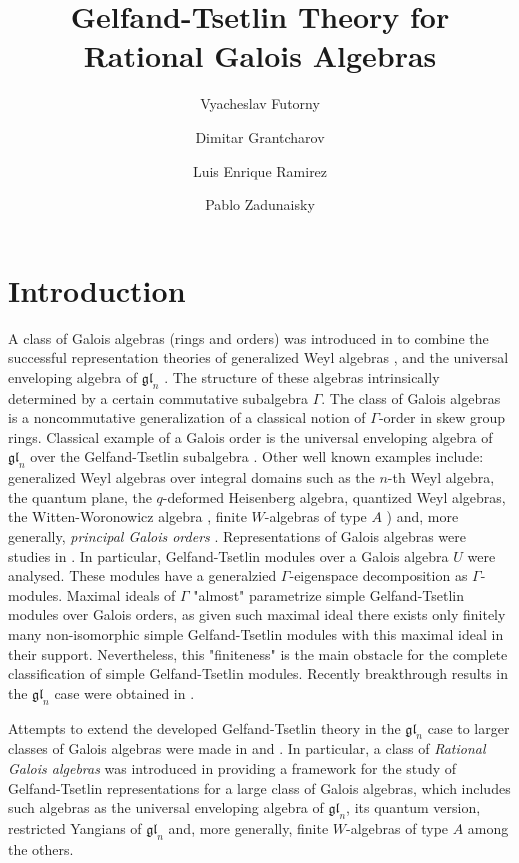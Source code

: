 \documentclass[11pt,fleqn]{amsart}
\title{Gelfand-Tsetlin Theory for Rational Galois Algebras}
\date{}
\author[V.Futorny]{Vyacheslav Futorny}
\author[D.Gratcharov]{Dimitar Grantcharov}
\author[L.E.Ramirez]{Luis Enrique Ramirez}
\author[P.Zadunaisky]{Pablo Zadunaisky}
\newcounter{para}[section]
\newcommand\gl{\mathfrak{gl}}
\begin{document}
\maketitle

\section{Introduction}
A class of Galois algebras (rings and orders) was introduced in 
\cite{FO-galois-orders} to combine the successful representation theories of 
generalized Weyl algebras \cite{Bav-GWA-reps}, \cite{BO-simple-WW} and the 
universal enveloping algebra of $\gl_n$ \cite{Ovs-finiteness}. The structure 
of these algebras intrinsically determined by a certain commutative subalgebra 
$\Gamma$. The class of Galois algebras is a noncommutative generalization of a 
classical notion of $\Gamma$-order in skew group rings. Classical example of a 
Galois order is the universal enveloping algebra of $\gl_n$ over the 
Gelfand-Tsetlin subalgebra \cites{DFO-GT-modules-original, DFO-GT-modules}. 
Other well known examples include: generalized 
Weyl algebras over integral domains such as the $n$-th Weyl algebra, the 
quantum plane, the $q$-deformed Heisenberg algebra, quantized Weyl algebras, 
the Witten-Wo\-ro\-no\-wicz algebra \cite{Bav-GWA-reps}, finite $W$-algebras of type $A$ 
\cite{FMO-gt-finite-w}) and, more generally, \emph{principal Galois orders} \cite{Hart-rational-galois}. 
Representations of Galois algebras were studies in \cite{FO-fibers-gt}. In particular, 
Gelfand-Tsetlin modules over a Galois algebra $U$ were analysed. These modules 
have a generalzied $\Gamma$-eigenspace decomposition as $\Gamma$-modules. 
Maximal ideals of $\Gamma$ "almost" parametrize simple Gelfand-Tsetlin modules 
over Galois orders, as given such maximal ideal there exists only finitely 
many non-isomorphic simple Gelfand-Tsetlin modules with this maximal ideal in 
their support. Nevertheless, this "finiteness" is the main obstacle for the 
complete classification of simple Gelfand-Tsetlin modules. Recently 
breakthrough results in the $\gl_n$ case were obtained in 
\cites{FGR-generic-irreducible, FGR-1-singular, FGR-2-index, FGR-drinfeld, 
Vis-geometric-1-singular-GT, Zad-1-sing, Vis-geometric-singular-GT, RZ-singular-characters}. 

Attempts to extend the developed Gelfand-Tsetlin theory in the $\gl_n$ case to 
larger classes of Galois algebras were made in \cites{Maz-orthogonal-GT-alg, EMV-orthogonal} and 
\cite{Hart-rational-galois}. In particular, a class of \emph{Rational Galois algebras} was 
introduced in \cite{Hart-rational-galois} providing a framework for the study of 
Gelfand-Tsetlin representations for a large class of Galois algebras, which 
includes such algebras as the universal enveloping algebra of $\gl_n$, its 
quantum version, restricted Yangians of $\gl_n$ and, more generally, finite 
$W$-algebras of type $A$ among the others.
\end{document}
